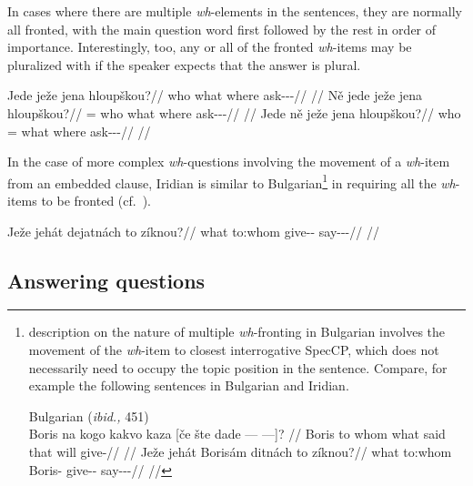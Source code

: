 In cases where there are multiple \emph{wh}-elements in the sentences, they are
normally all fronted, with the main question word first followed by the rest in
order of importance. Interestingly, too, any or all of the fronted
\emph{wh}-items may be pluralized with  if the speaker expects that the
answer is plural.

\pex
\a\begingl
\gla Jede ježe jena hloupškou?//
\glb who what where ask-\Av{}-\Pf{}-\Nz{}//
\glft {}//
\endgl
\a\begingl
\gla Ně jede ježe jena hloupškou?//
\glb \Pl{}= who what where ask-\Av{}-\Pf{}-\Nz{}//
\glft {}//
\endgl
\a\begingl
\gla Jede ně ježe jena hloupškou?//
\glb who \Pl{}= what where ask-\Av{}-\Pf{}-\Nz{}//
\glft {}//
\endgl
\xe

In the case of more complex \emph{wh}-questions involving the movement of a
  \emph{wh}-item from an embedded clause, Iridian is similar to
  Bulgarian\footnote{  description on the nature of multiple
  \emph{wh}-fronting in Bulgarian involves the movement of the
  \emph{wh}-item to closest interrogative SpecCP, which does not necessarily
  need to occupy the topic position in the sentence. Compare, for example the
  following sentences in Bulgarian and Iridian.

  \ex[lingstyle=fnex,belowexskip=-1em,aboveglftskip=1pt]
  Bulgarian (\emph{ibid.,} 451)\smallskip\\
    \begingl 
    \gla Boris na kogo kakvo kaza [če šte {dade --- ---]}? //
    \glb Boris to whom what said that will give-\Third{}\Sg{}//
    \glft {}//
  \endgl
  \xe
\smallskip
  \ex[lingstyle=fnex,belowexskip=-1em,aboveglftskip=1pt]
    \begingl 
    \gla Ježe jehát Borisám ditnách to zíknou?//
    \glb what to:whom Boris-\Agt{} give-\Pv{}-\Ctp{} \Rz{} say-\Pv{}-\Pf{}-\Nz{}//
    \glft {}//
  \endgl
  \xe

} in requiring all the \emph{wh}-items to be fronted (cf.~\cite[450]{rudin1988}).

\pex
\begingl
\gla Ježe jehát dejatnách to zíknou?//
\glb what to:whom give-\Pv{}-\Ctp{} \Rz{} say-\Pv{}-\Pf{}-\Nz{}//
\glft {}//
\endgl
\xe


\subsection{Answering questions}\label{sec:ansyn}

